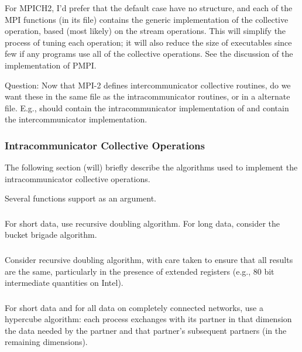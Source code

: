 \documentclass{article}
\begin{document}
For MPICH2, I'd prefer that the default case have no structure, and
each of the MPI functions (in its file) contains the generic
implementation of the collective operation, based (most likely) on the
stream operations.  This will simplify the process of tuning each
operation; it will also reduce the size of executables since few if
any programs use all of the collective operations.
See the discussion of the implementation of PMPI.

Question: Now that MPI-2 defines intercommunicator collective
routines, do we want these in the same file as the intracommunicator
routines, or in a alternate file.  E.g., should  contain
the intracommunicator implementation of  and
 contain the intercommunicator implementation.

\subsubsection{Intracommunicator Collective Operations}
The following section (will) briefly describe the algorithms used to implement
the intracommunicator collective operations.

Several functions support  as an argument.

\subsubsection{}
For short data, use recursive doubling algorithm.  For long data, consider the
bucket brigade algorithm.

\subsubsection{}
Consider recursive doubling algorithm, with care taken to ensure that all
results are the same, particularly in the presence of extended registers
(e.g., 80 bit intermediate quantities on Intel).

\subsubsection{}
For short data and for all data on completely connected networks, use a
hypercube algorithm: each process exchanges with its partner in that dimension
the data needed by the partner and that partner's subsequent partners (in the
remaining dimensions).
\end{document}
